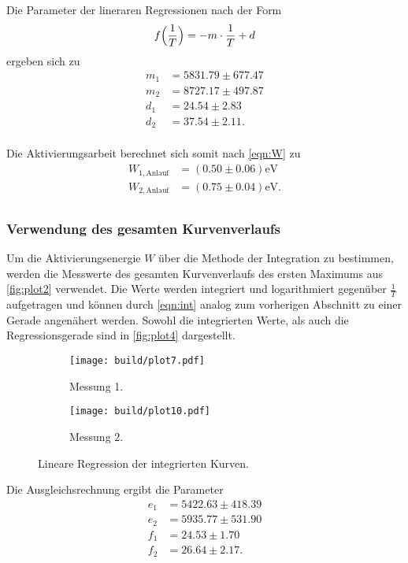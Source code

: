 Die Parameter der lineraren Regressionen nach der Form
\begin{equation}
  f\Bigl(\frac{1}{T}\Bigr)= -m\cdot \frac{1}{T} +d
\end{equation}
ergeben sich zu
\begin{align*}
  m_1 &= 5831.79 \pm 677.47 \\
  m_2 &= 8727.17 \pm 497.87\\
  d_1 &= 24.54 \pm 2.83\\
  d_2 &= 37.54 \pm 2.11.\\
\end{align*}

Die Aktivierungsarbeit berechnet sich somit nach \autoref{eqn:W} zu
\begin{align*}
  W_{1,\text{Anlauf}} &= (0.50 \pm 0.06) \unit{\electronvolt}\\
  W_{2,\text{Anlauf}} &= (0.75 \pm 0.04) \unit{\electronvolt}.\\
\end{align*} 

\subsubsection{Verwendung des gesamten Kurvenverlaufs}

Um die Aktivierungsenergie $W$ über die Methode der Integration zu bestimmen, werden die Messwerte des gesamten Kurvenverlaufs des ersten 
Maximums aus \autoref{fig:plot2} verwendet.
Die Werte werden integriert und logarithmiert gegenüber $\frac{1}{T}$ aufgetragen und können durch \autoref{eqn:int} analog zum vorherigen
Abschnitt zu einer Gerade angenähert werden.
Sowohl die integrierten Werte, als auch die Regressionsgerade sind in \autoref{fig:plot4} dargestellt.

\begin{figure}[H]
  \begin{subfigure}{\textwidth}
  \centering
  \texttt{[image: build/plot7.pdf]}
  \caption{Messung 1.}
  \label{fig:plot4a}
  \end{subfigure}
  \hfill
  \begin{subfigure}{\textwidth}
  \centering
  \texttt{[image: build/plot10.pdf]}
  \caption{Messung 2.}
  \label{fig:plot4b}
  \end{subfigure}
  \caption{Lineare Regression der integrierten Kurven.}
  \label{fig:plot4}
\end{figure}

Die Ausgleichsrechnung ergibt die Parameter
\begin{align*}
  e_1 &= 5422.63 \pm 418.39 \\
  e_2 &= 5935.77 \pm 531.90 \\
  f_1 &= 24.53 \pm 1.70 \\
  f_2 &= 26.64 \pm 2.17. \\
\end{align*}

